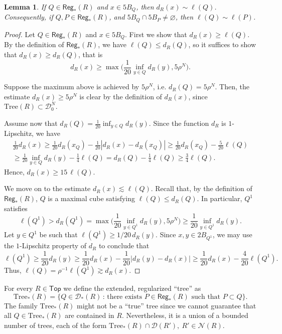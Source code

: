 \documentclass[11pt,reqno]{amsart}
\newcommand{\Top}{\mathsf{Top}}
\newcommand{\Tr}{\mathrm{Tree}}
\newcommand{\fr}[2]{\frac{#1}{#2}}
\newtheorem{lemma}[theorem]{Lemma}
\theoremstyle{definition}
\theoremstyle{remark}
\numberwithin{equation}{section}
\newcommand{\nbd}{\mathcal{N}}
\newcommand{\DD}{\mathcal{D}}
\newcommand{\Reg}{\mathsf{Reg}_*}
\theoremstyle{theorem}
\theoremstyle{definition}
\theoremstyle{remark}
\numberwithin{equation}{section}
\begin{document}
	\begin{lemma}\label{lem:regularprop}
		 If $Q\in\Reg(R)$ and $x\in 5B_Q$, then $d_R(x)\sim \ell(Q)$. Consequently, if $Q,P\in\Reg(R)$, and $5B_Q\cap 5B_P\neq\varnothing$, then $\ell(Q)\sim\ell(P)$.
	\end{lemma}
	\begin{proof}
		Let $Q\in\Reg(R)$ and $x\in 5B_Q$. First we show that $d_R(x)\ge \ell(Q)$. By the definition of $\Reg(R)$, we have $\ell(Q)\le d_R(Q)$, so it suffices to show that $d_R(x)\ge d_R(Q)$, that is
		\begin{equation*}
		d_R(x)\ge \max\big(\fr{1}{20}\inf_{y\in Q} d_R(y), 5\rho^N\big).
		\end{equation*}
		
		Suppose the maximum above is achieved by $5\rho^N$, i.e. $d_R(Q)=5\rho^N$. Then, the estimate $d_R(x)\ge 5\rho^N$ is clear by the definition of $d_R(x)$, since $\Tr(R)\subset\DD_0^N$.
		
		Assume now that $d_R(Q)=\fr{1}{20}\inf_{y\in Q} d_R(y)$. Since the function $d_R$ is $1$-Lipschitz, we have
		\begin{multline*}
		\fr{1}{20}d_R(x)\ge \fr{1}{20}d_R(x_Q) - \fr{1}{20}|d_R(x)-d_R(x_Q)|\ge \fr{1}{20}d_R(x_Q) - \fr{5}{20}\ell(Q)\\
		\ge \fr{1}{20}\inf_{y\in Q} d_R(y) - \fr{1}{4}\ell(Q) = d_R(Q) -  \fr{1}{4}\ell(Q) \ge \fr{3}{4}\ell(Q).
		\end{multline*}
		Hence, $d_R(x)\ge 15\,\ell(Q)$.
		
		We move on to the estimate $d_R(x)\lesssim \ell(Q)$. Recall that, by the definition of $\Reg(R)$, $Q$ is a maximal cube satisfying $\ell(Q)\le d_R(Q)$. In particular, $Q^1$ satisfies
		\begin{equation*}
		\ell(Q^1)> d_R(Q^1) = \max\big(\fr{1}{20}\inf_{y\in Q^1} d_R(y), 5\rho^N\big)\ge \fr{1}{20}\inf_{y\in Q^1} d_R(y).
		\end{equation*}
		Let $y\in Q^1$ be such that $\ell(Q^1)\ge 1/20\, d_R(y)$. Since $x,y\in 2B_{Q^1}$, we may use the $1$-Lipschitz property of $d_R$ to conclude that
		\begin{equation*}
		\ell(Q^1)\ge \fr{1}{20} d_R(y) \ge \fr{1}{20} d_R(x) - \fr{1}{20} |d_R(y)  - d_R(x)|\ge \fr{1}{20} d_R(x) - \fr{4}{20} \ell(Q^1).
		\end{equation*}
		Thus, $\ell(Q)=\rho^{-1}\ell(Q^1)\gtrsim d_R(x)$.
	\end{proof}

	For every $R\in\Top$ we define the extended, regularized ``tree'' as
	\begin{equation*}
	\Tr_*(R) = \{Q\in\DD_*(R)\, :\, \text{there exists $P\in\Reg(R)$ such that } P\subset Q \}.
	\end{equation*}
	The family $\Tr_*(R)$ might not be a ``true'' tree since we cannot guarantee that all $Q\in\Tr_*(R)$ are contained in $R$. Nevertheless, it is a union of a bounded number of trees, each of the form $\Tr_*(R)\cap \DD(R'),\ R'\in\nbd(R)$.
	
\end{document}
